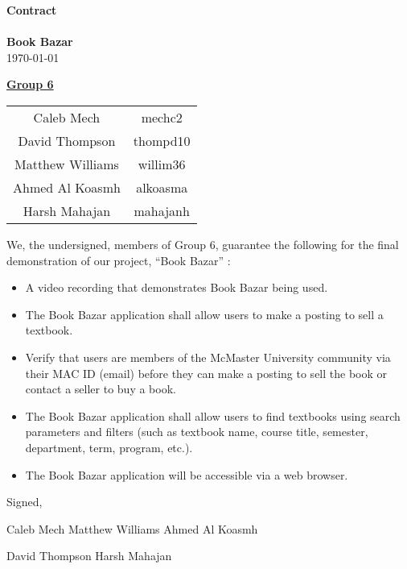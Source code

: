 \documentclass[fullpage]{article}
\newcommand{\bi}{\begin{itemize}}
\newcommand{\ei}{\end{itemize}}
\begin{document}
\vspace*{\fill}
\begin{center}

  {\Huge \textbf{Contract}}\\
\hrulefill\\[2mm]
  {\huge \textbf{Book Bazar}}\\[2mm]
{\large \today}\\[15mm]
{\large
\underline{\textbf{Group 6}}\\
\begin{tabular}{ c c }

 Caleb Mech & mechc2\\ 
 David Thompson & thompd10\\
 Matthew Williams & willim36\\
 Ahmed Al Koasmh & alkoasma\\
 Harsh Mahajan	& mahajanh    
\end{tabular}
}

\end{center}

\vspace*{\fill}

\newpage
We, the undersigned, members of Group 6, guarantee the following for the final demonstration of our project, ``Book Bazar'' :
\bi
\item A video recording that demonstrates Book Bazar being used.
\item The Book Bazar application shall allow users to make a posting to sell a textbook.
\item Verify that users are members of the McMaster University community via their MAC ID (email) before they can make a posting to sell the book or contact a seller to buy a book.
\item The Book Bazar application shall allow users to find textbooks using search parameters and filters (such as textbook name, course title, semester, department, term, program, etc.).
\item The Book Bazar application will be accessible via a web browser.\\
\ei


Signed,\\


\vspace{1.5cm}

Caleb Mech \hspace{3.5cm} Matthew Williams \hspace{3.5cm} Ahmed Al Koasmh\\

 \vspace{1.75cm} 

David Thompson \hspace{2.8cm} Harsh Mahajan
\end{document}
